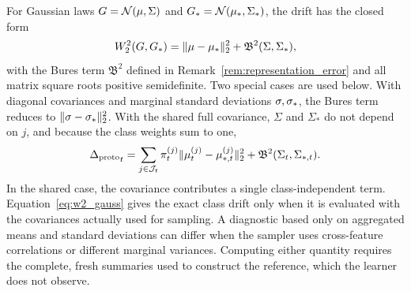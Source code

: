 For Gaussian laws $G=\mathcal N(\mu,\Sigma)$ and $G_*=\mathcal N(\mu_*,\Sigma_*)$, the drift has the closed form~\cite{dowson1982frechet,gelbrich1990formula}
\begin{equation}
 W_2^2(G,G_*)=\|\mu-\mu_*\|_2^2+\mathfrak B^2(\Sigma,\Sigma_*),
 \label{eq:w2_gauss}
\end{equation}
with the Bures term $\mathfrak B^2$ defined in Remark~\ref{rem:representation_error} and all matrix square roots positive semidefinite. Two special cases are used below. With diagonal covariances and marginal standard deviations $\sigma,\sigma_*$, the Bures term reduces to $\|\sigma-\sigma_*\|_2^2$. With the shared full covariance, $\Sigma$ and $\Sigma_*$ do not depend on $j$, and because the class weights sum to one,
\begin{equation}
 {\Delta_{\mathrm{proto}}}_t=\sum_{j\in\mathcal J_t}\pi_t^{(j)}
 \|\mu_t^{(j)}-\mu_{*,t}^{(j)}\|_2^2
 +\mathfrak B^2(\Sigma_t,\Sigma_{*,t}).
 \label{eq:shared_drift}
\end{equation}
In the shared case, the covariance contributes a single class-independent term. Equation~\eqref{eq:w2_gauss} gives the exact class drift only when it is evaluated with the covariances actually used for sampling. A diagnostic based only on aggregated means and standard deviations can differ when the sampler uses cross-feature correlations or different marginal variances. Computing either quantity requires the complete, fresh summaries used to construct the reference, which the learner does not observe.

